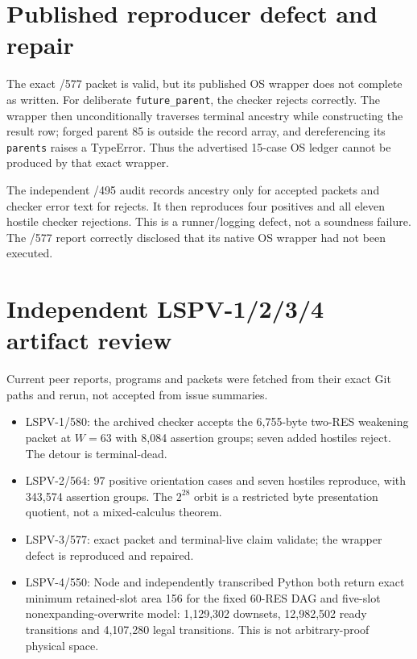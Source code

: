 \documentclass[11pt]{article}
\begin{document}
\section*{Published reproducer defect and repair}
The exact /577 packet is valid, but its published OS wrapper does not complete
as written. For deliberate \texttt{future\_parent}, the checker rejects
correctly. The wrapper then unconditionally traverses terminal ancestry while
constructing the result row; forged parent 85 is outside the record array, and
dereferencing its \texttt{parents} raises a TypeError. Thus the advertised
15-case OS ledger cannot be produced by that exact wrapper.

The independent /495 audit records ancestry only for accepted packets and
checker error text for rejects. It then reproduces four positives and all eleven
hostile checker rejections. This is a runner/logging defect, not a soundness
failure. The /577 report correctly disclosed that its native OS wrapper had not
been executed.

\section*{Independent LSPV-1/2/3/4 artifact review}
Current peer reports, programs and packets were fetched from their exact Git
paths and rerun, not accepted from issue summaries.
\begin{itemize}
\item LSPV-1/580: the archived checker accepts the 6,755-byte two-RES
weakening packet at $W=63$ with 8,084 assertion groups; seven added hostiles
reject. The detour is terminal-dead.
\item LSPV-2/564: 97 positive orientation cases and seven hostiles reproduce,
with 343,574 assertion groups. The $2^{28}$ orbit is a restricted byte
presentation quotient, not a mixed-calculus theorem.
\item LSPV-3/577: exact packet and terminal-live claim validate; the wrapper
defect is reproduced and repaired.
\item LSPV-4/550: Node and independently transcribed Python both return exact
minimum retained-slot area 156 for the fixed 60-RES DAG and five-slot
nonexpanding-overwrite model: 1,129,302 downsets, 12,982,502 ready transitions
and 4,107,280 legal transitions. This is not arbitrary-proof physical space.
\end{itemize}
\end{document}
